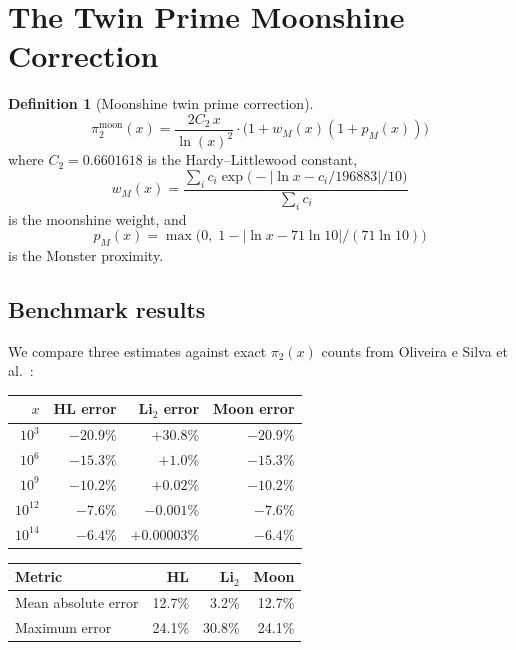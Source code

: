 \documentclass[11pt]{amsart}
\theoremstyle{definition}
\newtheorem{definition}[theorem]{Definition}
\begin{document}
\section{The Twin Prime Moonshine Correction}
\label{sec:twin}

\begin{definition}[Moonshine twin prime correction]
\begin{equation}
\pi_2^{\mathrm{moon}}(x) = \frac{2C_2\, x}{\ln(x)^2} \cdot \bigl(1 + w_M(x)(1 + p_M(x))\bigr)
\end{equation}
where $C_2 = 0.6601618$ is the Hardy--Littlewood constant,
\begin{equation}
w_M(x) = \frac{\sum_i c_i \exp\!\bigl(-|\ln x - c_i/196883|/10\bigr)}{\sum_i c_i}
\end{equation}
is the moonshine weight, and
\begin{equation}
p_M(x) = \max\!\bigl(0,\; 1 - |\ln x - 71\ln 10|/(71\ln 10)\bigr)
\end{equation}
is the Monster proximity.
\end{definition}

\subsection{Benchmark results}

We compare three estimates against exact $\pi_2(x)$ counts from Oliveira e Silva et al.\ \cite{oliveira2014}:

\begin{center}
\begin{tabular}{r r r r}
\toprule
$x$ & HL error & Li$_2$ error & Moon error \\
\midrule
$10^{3}$ & $-20.9\%$ & $+30.8\%$ & $-20.9\%$ \\
$10^{6}$ & $-15.3\%$ & $+1.0\%$ & $-15.3\%$ \\
$10^{9}$ & $-10.2\%$ & $+0.02\%$ & $-10.2\%$ \\
$10^{12}$ & $-7.6\%$ & $-0.001\%$ & $-7.6\%$ \\
$10^{14}$ & $-6.4\%$ & $+0.00003\%$ & $-6.4\%$ \\
\bottomrule
\end{tabular}
\end{center}

\begin{center}
\begin{tabular}{l r r r}
\toprule
Metric & HL & Li$_2$ & Moon \\
\midrule
Mean absolute error & 12.7\% & 3.2\% & 12.7\% \\
Maximum error & 24.1\% & 30.8\% & 24.1\% \\
\bottomrule
\end{tabular}
\end{center}
\end{document}
